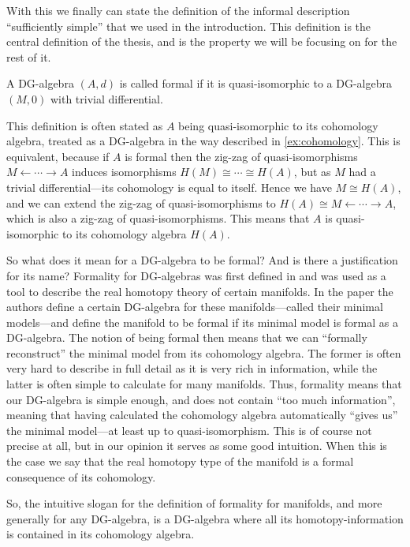 With this we finally can state the definition of the informal description ``sufficiently simple'' that we used in the introduction. This definition is the central definition of the thesis, and is the property we will be focusing on for the rest of it. 

\begin{definition}
\label{def:formal_dga}
A DG-algebra $(A, d)$ is called formal if it is quasi-isomorphic to a DG-algebra $(M, 0)$ with trivial differential. 
\end{definition}

This definition is often stated as $A$ being quasi-isomorphic to its cohomology algebra, treated as a DG-algebra in the way described in \ref{ex:cohomology}. This is equivalent, because if $A$ is formal then the zig-zag of quasi-isomorphisms $M \leftarrow \cdots \rightarrow A$ induces isomorphisms $H(M)\cong \cdots \cong H(A)$, but as $M$ had a trivial differential---its cohomology is equal to itself. Hence we have $M\cong H(A)$, and we can extend the zig-zag of quasi-isomorphisms to $H(A)\cong M \leftarrow \cdots \rightarrow A$, which is also a zig-zag of quasi-isomorphisms. This means that $A$ is quasi-isomorphic to its cohomology algebra $H(A)$. 

So what does it mean for a DG-algebra to be formal? And is there a justification for its name? Formality for DG-algebras was first defined in \cite{DGMS} and was used as a tool to describe the real homotopy theory of certain manifolds. In the paper the authors define a certain DG-algebra for these manifolds---called their minimal models---and define the manifold to be formal if its minimal model is formal as a DG-algebra. The notion of being formal then means that we can ``formally reconstruct'' the minimal model from its cohomology algebra. The former is often very hard to describe in full detail as it is very rich in information, while the latter is often simple to calculate for many manifolds. Thus, formality means that our DG-algebra is simple enough, and does not contain ``too much information'', meaning that having calculated the cohomology algebra automatically ``gives us'' the minimal model---at least up to quasi-isomorphism. This is of course not precise at all, but in our opinion it serves as some good intuition. When this is the case we say that the real homotopy type of the manifold is a formal consequence of its cohomology. 

So, the intuitive slogan for the definition of formality for manifolds, and more generally for any DG-algebra, is a DG-algebra where all its homotopy-information is contained in its cohomology algebra.

